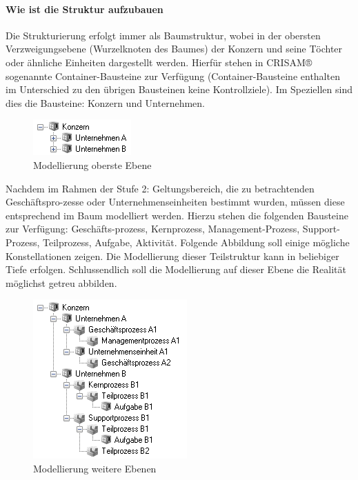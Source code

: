 \paragraph{Wie ist die Struktur aufzubauen}
Die Strukturierung erfolgt immer als Baumstruktur, wobei in der obersten Verzweigungsebene (Wurzelknoten des Baumes) der Konzern und seine Töchter oder ähnliche Einheiten dargestellt werden. Hierfür stehen in CRISAM® sogenannte Container-Bausteine zur Verfügung (Container-Bausteine enthalten im Unterschied zu den übrigen Bausteinen keine Kontrollziele). Im Speziellen sind dies die Bausteine: Konzern und Unternehmen.

\begin{figure}[htbp]
	\centering
	\includegraphics[scale =1 ]{images/Modellierung.png}
	\caption{Modellierung oberste Ebene}
	\label{fig:Modellierung}
\end{figure}
Nachdem im Rahmen der Stufe 2: Geltungsbereich, die zu betrachtenden Geschäftspro-zesse oder Unternehmenseinheiten bestimmt wurden, müssen diese entsprechend im Baum modelliert werden. Hierzu stehen die folgenden Bausteine zur Verfügung: Geschäfts-prozess, Kernprozess, Management-Prozess, Support-Prozess, Teilprozess, Aufgabe, Aktivität.
Folgende Abbildung soll einige mögliche Konstellationen zeigen. Die Modellierung dieser Teilstruktur kann in beliebiger Tiefe erfolgen. Schlussendlich soll die Modellierung auf dieser Ebene die Realität möglichst getreu abbilden.

\begin{figure}[htbp]
	\centering
	\includegraphics[scale =1 ]{images/weiterebenen.png}
	\caption{Modellierung weitere Ebenen}
	\label{fig:weiterebenen}
\end{figure}

